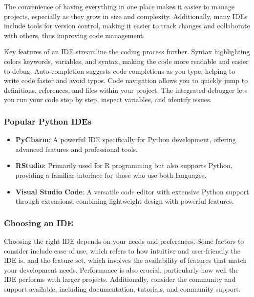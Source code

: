 \documentclass[
  letterpaper,
  DIV=11,
  numbers=noendperiod]{scrreprt}
\providecommand{\tightlist}{%
  \setlength{\itemsep}{0pt}\setlength{\parskip}{0pt}}\usepackage{longtable,booktabs,array}
\begin{document}
The convenience of having everything in one place makes it easier to
manage projects, especially as they grow in size and complexity.
Additionally, many IDEs include tools for version control, making it
easier to track changes and collaborate with others, thus improving code
management.

Key features of an IDE streamline the coding process further. Syntax
highlighting colors keywords, variables, and syntax, making the code
more readable and easier to debug. Auto-completion suggests code
completions as you type, helping to write code faster and avoid typos.
Code navigation allows you to quickly jump to definitions, references,
and files within your project. The integrated debugger lets you run your
code step by step, inspect variables, and identify issues.

\hypertarget{popular-python-ides}{%
\subsubsection{Popular Python IDEs}\label{popular-python-ides}}

\begin{itemize}
\tightlist
\item
  \textbf{PyCharm}: A powerful IDE specifically for Python development,
  offering advanced features and professional tools.
\item
  \textbf{RStudio}: Primarily used for R programming but also supports
  Python, providing a familiar interface for those who use both
  languages.
\item
  \textbf{Visual Studio Code}: A versatile code editor with extensive
  Python support through extensions, combining lightweight design with
  powerful features.
\end{itemize}

\hypertarget{choosing-an-ide}{%
\subsubsection{Choosing an IDE}\label{choosing-an-ide}}

Choosing the right IDE depends on your needs and preferences. Some
factors to consider include ease of use, which refers to how intuitive
and user-friendly the IDE is, and the feature set, which involves the
availability of features that match your development needs. Performance
is also crucial, particularly how well the IDE performs with larger
projects. Additionally, consider the community and support available,
including documentation, tutorials, and community support.
\end{document}
